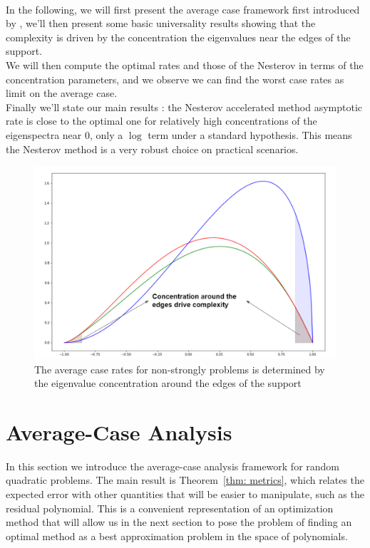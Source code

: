 \documentclass{article}
\begin{document}
\paragraph{}
In the following, we will first present the average case framework first introduced by \cite{pedregosa2020acceleration}, we'll then present some basic universality results showing that the complexity is driven by the concentration the eigenvalues near the edges of the support. \\
We will then compute the optimal rates and those of the Nesterov in terms of the concentration parameters, and we observe we can find the worst case rates as limit on the average case. \\
Finally we'll state our main results : the Nesterov accelerated method asymptotic rate is close to the optimal one for relatively high concentrations of the eigenspectra near $0$, only a $\log$ term under a standard hypothesis. This means the Nesterov method is a very robust choice on practical scenarios.


\begin{figure}[H]
    \centering
    \includegraphics[width=8 cm]{imgs/concentration.PNG}
    \caption{The average case rates for non-strongly problems is determined by the eigenvalue concentration around the edges of the support }
    \label{fig:my_label}
\end{figure}

\section{Average-Case Analysis} \label{sec:methods}


In this section we introduce the average-case analysis framework for random quadratic problems.
The main result is Theorem~\ref{thm: metrics}, which relates the expected error with other quantities that will be easier to manipulate, such as the residual polynomial. This is a convenient representation of an optimization method that will allow us in the next section to pose the problem of finding an optimal method as a best approximation problem in the space of polynomials.
\end{document}
